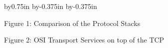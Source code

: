 

\advance\textwidth by0.75in
\advance\oddsidemargin by-0.375in
\advance\evensidemargin by-0.375in

\pagestyle{empty}





\centerline{\box\graph}
\vspace{1in}
\begin{center}
Figure 1: Comparison of the Protocol Stacks
\end{center}

\newpage


\centerline{\box\graph}
\vspace{2in}
\begin{center}
Figure 2: OSI Transport Services on top of the TCP
\end{center}



